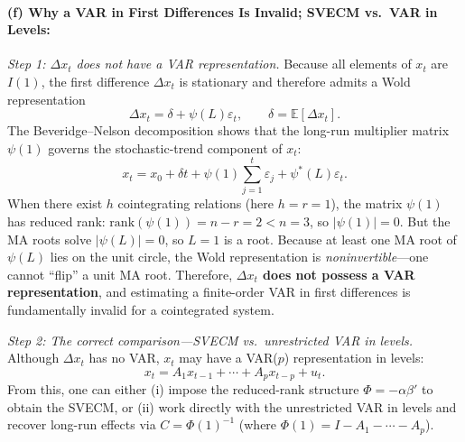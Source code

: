 \documentclass[12pt]{article}
\newcommand{\E}{\mathbb E}
\newcommand{\rank}{\mathrm{rank}}
\theoremstyle{definition}
\begin{document}
\bigskip
\paragraph{(f) Why a VAR in First Differences Is Invalid; SVECM vs.\ VAR in Levels:}

\emph{Step 1: $\Delta x_t$ does not have a VAR representation.}
Because all elements of $x_t$ are $I(1)$, the first difference $\Delta x_t$ is stationary and therefore admits a Wold representation
\[
\Delta x_t = \delta + \psi(L)\varepsilon_t, \qquad \delta = \E[\Delta x_t].
\]
The Beveridge--Nelson decomposition shows that the long-run multiplier matrix $\psi(1)$ governs the stochastic-trend component of $x_t$:
\[
x_t = x_0 + \delta t + \psi(1)\textstyle\sum_{j=1}^{t}\varepsilon_j + \psi^*(L)\varepsilon_t.
\]
When there exist $h$ cointegrating relations (here $h = r = 1$), the matrix $\psi(1)$ has reduced rank: $\rank(\psi(1)) = n - r = 2 < n = 3$, so $|\psi(1)| = 0$. But the MA roots solve $|\psi(L)| = 0$, so $L = 1$ is a root. Because at least one MA root of $\psi(L)$ lies on the unit circle, the Wold representation is \emph{noninvertible}---one cannot ``flip'' a unit MA root. Therefore, \textbf{$\Delta x_t$ does not possess a VAR representation}, and estimating a finite-order VAR in first differences is fundamentally invalid for a cointegrated system.

\medskip
\noindent \emph{Step 2: The correct comparison---SVECM vs.\ unrestricted VAR in levels.} Although $\Delta x_t$ has no VAR, $x_t$ may have a VAR($p$) representation in levels:
\[
x_t = A_1 x_{t-1} + \cdots + A_p x_{t-p} + u_t.
\]
From this, one can either (i) impose the reduced-rank structure $\Phi = -\alpha\beta'$ to obtain the SVECM, or (ii) work directly with the unrestricted VAR in levels and recover long-run effects via $C = \Phi(1)^{-1}$ (where $\Phi(1) = I - A_1 - \cdots - A_p$).
\end{document}
